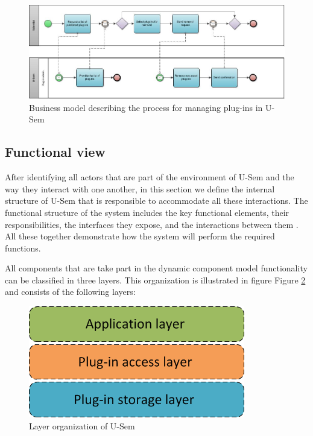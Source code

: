 \begin{figure}[h!]
  \centering
  	\includegraphics[scale=0.6]{plug-in/business_processes/PluginManagementBusinessModel.jpg}
  \caption{Business model describing the process for managing plug-ins in U-Sem}
  \label{fig_admin_bpm}
\end{figure}


\subsection{Functional view}

After identifying all actors that are part of the environment of U-Sem and the way they interact with one another, in this section we define the internal structure of U-Sem that is responsible to accommodate all these interactions. The functional structure of the system includes the key functional elements, their responsibilities, the interfaces they expose, and the interactions between them \cite{Rozanski}. All these together demonstrate how the system will perform the required functions.

All components that are take part in the dynamic component model functionality can be classified in three layers. This organization is illustrated in figure Figure \ref{fig_layer} and consists of the following layers:

\begin{figure}[h!]
  \centering
  	\includegraphics[scale=0.6]{plug-in/layers/layers.png}
  \caption{Layer organization of U-Sem}
  \label{fig_layer}
\end{figure}

